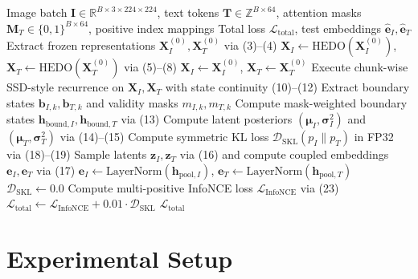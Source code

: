 \documentclass[journal]{IEEEtran}
\begin{document}
\begin{algorithm}[t]
\caption{HEDO-HVSC Forward Pass and Training Step}
\label{alg:hedo_hvsc}
\begin{algorithmic}[1]
\REQUIRE Image batch $\mathbf{I} \in \mathbb{R}^{B \times 3 \times 224 \times 224}$, text tokens $\mathbf{T} \in \mathbb{Z}^{B \times 64}$, attention masks $\mathbf{M}_T \in \{0, 1\}^{B \times 64}$, positive index mappings
\ENSURE Total loss $\mathcal{L}_{\text{total}}$, test embeddings $\hat{\mathbf{e}}_I, \hat{\mathbf{e}}_T$
\STATE Extract frozen representations $\mathbf{X}_I^{(0)}, \mathbf{X}_T^{(0)}$ via (3)--(4)
    \STATE $\mathbf{X}_I \leftarrow \text{HEDO}(\mathbf{X}_I^{(0)})$, $\mathbf{X}_T \leftarrow \text{HEDO}(\mathbf{X}_T^{(0)})$ via (5)--(8)
\ELSE
    \STATE $\mathbf{X}_I \leftarrow \mathbf{X}_I^{(0)}$, $\mathbf{X}_T \leftarrow \mathbf{X}_T^{(0)}$
\ENDIF
\STATE Execute chunk-wise SSD-style recurrence on $\mathbf{X}_I, \mathbf{X}_T$ with state continuity (10)--(12)
\STATE Extract boundary states $\mathbf{b}_{I, k}, \mathbf{b}_{T, k}$ and validity masks $m_{I, k}, m_{T, k}$
    \STATE Compute mask-weighted boundary states $\mathbf{h}_{\text{bound}, I}, \mathbf{h}_{\text{bound}, T}$ via (13)
    \STATE Compute latent posteriors $(\boldsymbol{\mu}_I, \boldsymbol{\sigma}_I^2)$ and $(\boldsymbol{\mu}_T, \boldsymbol{\sigma}_T^2)$ via (14)--(15)
    \STATE Compute symmetric KL loss $\mathcal{D}_{\text{SKL}}(p_I \parallel p_T)$ in FP32 via (18)--(19)
    \STATE Sample latents $\mathbf{z}_I, \mathbf{z}_T$ via (16) and compute coupled embeddings $\mathbf{e}_I, \mathbf{e}_T$ via (17)
\ELSE
    \STATE $\mathbf{e}_I \leftarrow \text{LayerNorm}(\mathbf{h}_{\text{pool}, I})$, $\mathbf{e}_T \leftarrow \text{LayerNorm}(\mathbf{h}_{\text{pool}, T})$
    \STATE $\mathcal{D}_{\text{SKL}} \leftarrow 0.0$
\ENDIF
\STATE Compute multi-positive InfoNCE loss $\mathcal{L}_{\text{InfoNCE}}$ via (23)
\STATE $\mathcal{L}_{\text{total}} \leftarrow \mathcal{L}_{\text{InfoNCE}} + 0.01 \cdot \mathcal{D}_{\text{SKL}}$
\RETURN $\mathcal{L}_{\text{total}}$
\end{algorithmic}
\end{algorithm}

\section{Experimental Setup}
\label{sec:experimental_setup}
\end{document}
